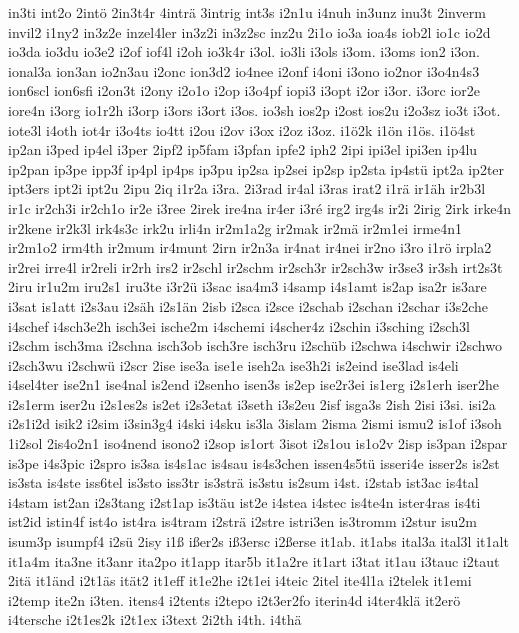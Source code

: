 {in3ti
int2o
2intö
2in3t4r
4inträ
3intrig
int3s
i2n1u
i4nuh
in3unz
inu3t
2inverm
invil2
i1ny2
in3z2e
inzel4ler
in3z2i
in3z2sc
inz2u
2i1o
io3a
ioa4s
iob2l
io1c
io2d
io3da
io3du
io3e2
i2of
iof4l
i2oh
io3k4r
i3ol.
io3li
i3ols
i3om.
i3oms
ion2
i3on.
ional3a
ion3an
io2n3au
i2onc
ion3d2
io4nee
i2onf
i4oni
i3ono
io2nor
i3o4n4s3
ion6scl
ion6sfi
i2on3t
i2ony
i2o1o
i2op
i3o4pf
iopi3
i3opt
i2or
i3or.
i3orc
ior2e
iore4n
i3org
io1r2h
i3orp
i3ors
i3ort
i3os.
io3sh
ios2p
i2ost
ios2u
i2o3sz
io3t
i3ot.
iote3l
i4oth
iot4r
i3o4ts
io4tt
i2ou
i2ov
i3ox
i2oz
i3oz.
i1ö2k
i1ön
i1ös.
i1ö4st
ip2an
i3ped
ip4el
i3per
2ipf2
ip5fam
i3pfan
ipfe2
iph2
2ipi
ipi3el
ipi3en
ip4lu
ip2pan
ip3pe
ipp3f
ip4pl
ip4ps
ip3pu
ip2sa
ip2sei
ip2sp
ip2sta
ip4stü
ipt2a
ip2ter
ipt3ers
ipt2i
ipt2u
2ipu
2iq
i1r2a
i3ra.
2i3rad
ir4al
i3ras
irat2
i1rä
ir1äh
ir2b3l
ir1c
ir2ch3i
ir2ch1o
ir2e
i3ree
2irek
ire4na
ir4er
i3ré
irg2
irg4s
ir2i
2irig
2irk
irke4n
ir2kene
ir2k3l
irk4s3c
irk2u
irli4n
ir2m1a2g
ir2mak
ir2mä
ir2m1ei
irme4n1
ir2m1o2
irm4th
ir2mum
ir4munt
2irn
ir2n3a
ir4nat
ir4nei
ir2no
i3ro
i1rö
irpla2
ir2rei
irre4l
ir2reli
ir2rh
irs2
ir2schl
ir2schm
ir2sch3r
ir2sch3w
ir3se3
ir3sh
irt2s3t
2iru
ir1u2m
iru2s1
iru3te
i3r2ü
i3sac
isa4m3
i4samp
i4s1amt
is2ap
isa2r
is3are
i3sat
is1att
i2s3au
i2säh
i2s1än
2isb
i2sca
i2sce
i2schab
i2schan
i2schar
i3s2che
i4schef
i4sch3e2h
isch3ei
ische2m
i4schemi
i4scher4z
i2schin
i3sching
i2sch3l
i2schm
isch3ma
i2schna
isch3ob
isch3re
isch3ru
i2schüb
i2schwa
i4schwir
i2schwo
i2sch3wu
i2schwü
i2scr
2ise
ise3a
ise1e
iseh2a
ise3h2i
is2eind
ise3lad
is4eli
i4sel4ter
ise2n1
ise4nal
is2end
i2senho
isen3s
is2ep
ise2r3ei
is1erg
i2s1erh
iser2he
i2s1erm
iser2u
i2s1es2s
is2et
i2s3etat
i3seth
i3s2eu
2isf
isga3s
2ish
2isi
i3si.
isi2a
i2s1i2d
isik2
i2sim
i3sin3g4
i4ski
i4sku
is3la
3islam
2isma
2ismi
ismu2
is1of
i3soh
1i2sol
2is4o2n1
iso4nend
isono2
i2sop
is1ort
3isot
i2s1ou
is1o2v
2isp
is3pan
i2spar
is3pe
i4s3pic
i2spro
is3sa
is4s1ac
is4sau
is4s3chen
issen4s5tü
isseri4e
isser2s
is2st
is3sta
is4ste
iss6tel
is3sto
iss3tr
is3strä
is3stu
is2sum
i4st.
i2stab
ist3ac
is4tal
i4stam
ist2an
i2s3tang
i2st1ap
is3täu
ist2e
i4stea
i4stec
is4te4n
ister4ras
is4ti
ist2id
istin4f
ist4o
ist4ra
is4tram
i2strä
i2stre
istri3en
is3tromm
i2stur
isu2m
isum3p
isumpf4
i2sü
2isy
i1ß
ißer2s
iß3ersc
i2ßerse
it1ab.
it1abs
ital3a
ital3l
it1alt
it1a4m
ita3ne
it3anr
ita2po
it1app
itar5b
it1a2re
it1art
i3tat
it1au
i3tauc
i2taut
2itä
it1änd
i2t1äs
ität2
it1eff
it1e2he
i2t1ei
i4teic
2itel
ite4l1a
i2telek
it1emi
i2temp
ite2n
i3ten.
itens4
i2tents
i2tepo
i2t3er2fo
iterin4d
i4ter4klä
it2erö
i4tersche
i2t1es2k
i2t1ex
i3text
2i2th
i4th.
i4thä
}
